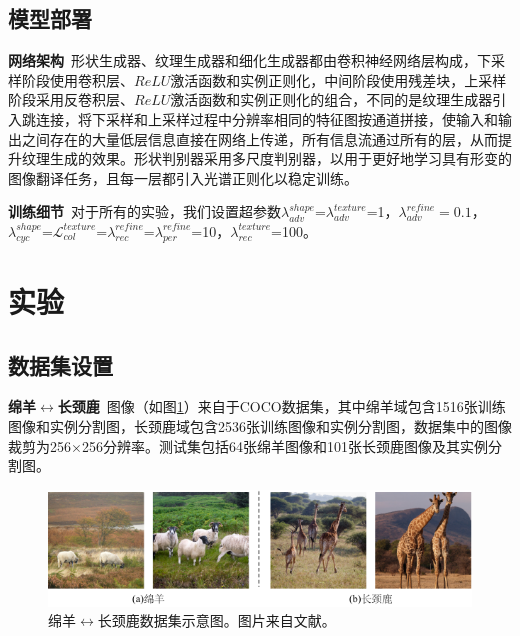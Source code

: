 \subsection{模型部署}

\textbf{网络架构}~形状生成器、纹理生成器和细化生成器都由卷积神经网络层构成，下采样阶段使用卷积层、$ReLU$激活函数和实例正则化，中间阶段使用残差块，上采样阶段采用反卷积层、$ReLU$激活函数和实例正则化的组合，不同的是纹理生成器引入跳连接\cite{ronneberger2015u}，将下采样和上采样过程中分辨率相同的特征图按通道拼接，使输入和输出之间存在的大量低层信息直接在网络上传递，所有信息流通过所有的层，从而提升纹理生成的效果。形状判别器采用多尺度判别器\cite{wang2018high}，以用于更好地学习具有形变的图像翻译任务，且每一层都引入光谱正则化以稳定训练。

\textbf{训练细节}~对于所有的实验，我们设置超参数$\lambda_{adv}^{shape}$=$\lambda_{adv}^{texture}$=1，$\lambda_{adv}^{refine}=0.1$，$\lambda_{cyc}^{shape}$=$\mathcal{L}_{col}^{texture}$=$\lambda_{rec}^{refine}$=$\lambda_{per}^{refine}$=10，$\lambda_{rec}^{texture}$=100。

\section{实验}

\subsection{数据集设置}

\textbf{绵羊}$\leftrightarrow$\textbf{长颈鹿}~图像（如图\ref{fig:shp2gir_coco}）来自于COCO数据集\cite{lin2014microsoft}，其中绵羊域包含1516张训练图像和实例分割图，长颈鹿域包含2536张训练图像和实例分割图，数据集中的图像裁剪为256$\times$256分辨率。测试集包括64张绵羊图像和101张长颈鹿图像及其实例分割图。

\begin{figure}[ht]
    \centering
  \includegraphics[width=\textwidth]{figs/shp2gir_coco.pdf}
  \caption{绵羊$\leftrightarrow$长颈鹿数据集示意图。图片来自文献\cite{lin2014microsoft}。}
  \label{fig:shp2gir_coco}
\end{figure}

